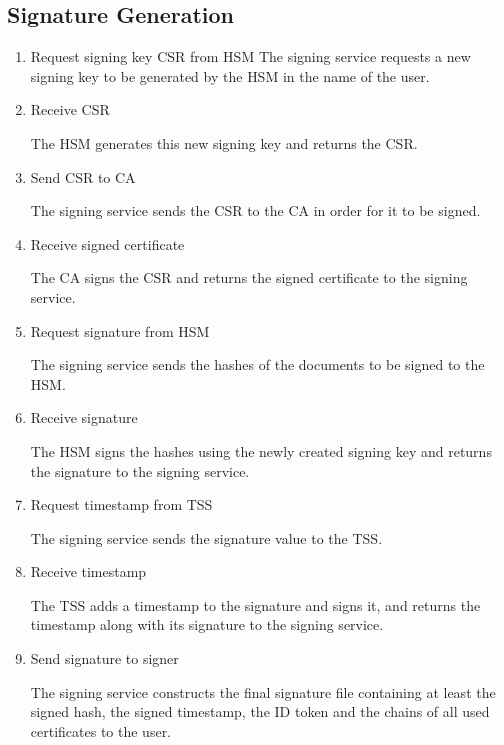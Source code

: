 \subsection{Signature Generation}\label{subsec:signature-generation}
\begin{enumerate}[resume]
    \item Request signing key \gls{CSR} from \gls{HSM}
    The signing service requests a new signing key to be generated by the \gls{HSM} in the name of the user.

    \item Receive \gls{CSR}

    The HSM generates this new signing key and returns the \acrfull{CSR}.

    \item Send \gls{CSR} to \gls{CA}

    The signing service sends the \gls{CSR} to the \gls{CA} in order for it to be signed.

    \item Receive signed certificate

    The \gls{CA} signs the \gls{CSR} and returns the signed certificate to the signing service.

    \item Request signature from \gls{HSM}

    The signing service sends the hashes of the documents to be signed to the \gls{HSM}.

    \item Receive signature

    The \gls{HSM} signs the hashes using the newly created signing key and returns the signature to the signing service.

    \item Request timestamp from \gls{TSS}

    The signing service sends the signature value to the \gls{TSS}.

    \item Receive timestamp

    The \gls{TSS} adds a timestamp to the signature and signs it,
    and returns the timestamp along with its signature to the signing service.

    \item Send signature to signer

    The signing service constructs the final signature file containing at least the signed hash,
    the signed timestamp, the ID token and the chains of all used certificates to the user.
\end{enumerate}

